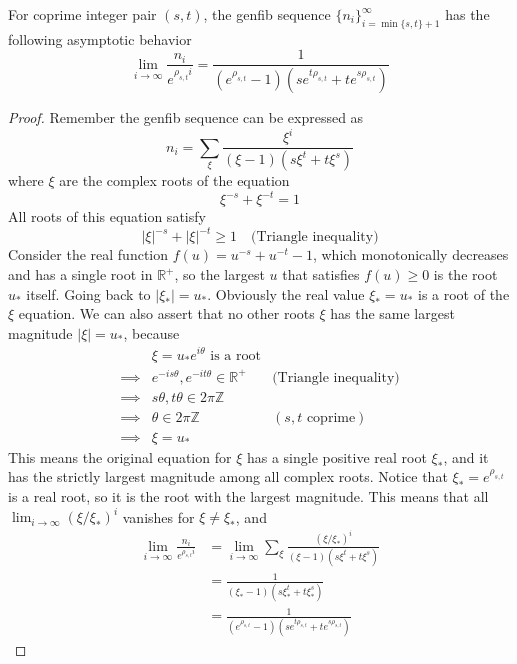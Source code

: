 \documentclass[]{article}
\begin{document}
\vspace{1cm}
\begin{lemma}
	For coprime integer pair $(s, t)$, the genfib sequence $\{n_i\}_{i=\min\{s,t\}+1}^{\infty}$ has the following asymptotic behavior
	\[
	\lim_{i\to\infty}    \frac{n_i}{e^{\rho_{s,t} i}} = \frac{1}{( e^{\rho_{s,t}} - 1)(s e^{t\rho_{s,t}} + t e^{s\rho_{s,t}})}
	\]
\end{lemma}
\begin{proof}
	Remember the genfib sequence can be expressed as 
	\[
	n_i = \sum_{\xi} \frac{\xi^i}{(\xi - 1)(s \xi^t + t \xi^s)}
	\]
	where $\xi$ are the complex roots of the equation
	\[
	\xi^{-s} + \xi^{-t} = 1
	\]
	All roots of this equation satisfy
	\[
	|\xi|^{-s} + |\xi|^{-t} \ge 1 \quad \text{(Triangle inequality)}
	\]
	Consider the real function $f(u) = u^{-s} + u^{-t} - 1$, which monotonically decreases and has a single root in $\mathbb{R}^+$, so the largest $u$ that satisfies $f(u)\ge 0$ is the root $u_*$ itself. Going back to $|\xi_*| = u_*$. Obviously the real value $\xi_* = u_*$ is a root of the $\xi$ equation. We can also assert that no other roots $\xi$ has the same largest magnitude  $|\xi| = u_*$, because
	\begin{align*}
	&\xi = u_*e^{i\theta} \text{ is a root} \\
	\implies& e^{-i s\theta}, e^{-i t\theta} \in \mathbb{R}^+ \quad &\text{(Triangle inequality)} \\
	\implies& s\theta, t\theta \in 2\pi\mathbb{Z} \\
	\implies& \theta \in 2\pi\mathbb{Z} \quad &(s, t \text{ coprime})\\
	\implies& \xi = u_*
	\end{align*}
	This means the original equation for $\xi$ has a single positive real root $\xi_*$, and it has the strictly largest magnitude among all complex roots. Notice that $\xi_* = e^{\rho_{s,t}}$ is a real root, so it is the root with the largest magnitude. This means that all $\lim_{i\to\infty} (\xi/\xi_*)^i$ vanishes for $\xi\ne\xi_*$, and
	\begin{align*}
	\lim_{i\to\infty}    \frac{n_i}{e^{\rho_{s,t} i}} &= \lim_{i\to\infty} \sum_{\xi} \frac{(\xi / \xi_*)^i}{(\xi - 1)(s \xi^t + t \xi^s)} \\
	&=\frac{1}{(\xi_* - 1)(s \xi_*^t + t \xi_*^s)} \\
	&=\frac{1}{( e^{\rho_{s,t}} - 1)(s e^{t\rho_{s,t}} + t e^{s\rho_{s,t}})}
	\end{align*}

\end{proof}
\end{document}
